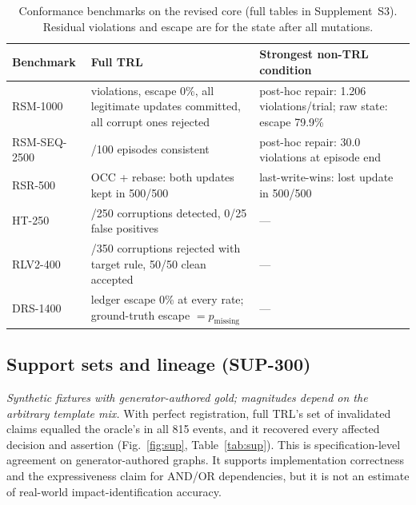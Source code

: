 \documentclass[journal]{IEEEtran}
\newcommand{\suppl}[1]{Supplement~#1}
\begin{document}
\begin{table}[t]
\centering
\caption{Conformance benchmarks on the revised core (full tables in \suppl{S3}). Residual violations and escape are for the state after all mutations.}
\label{tab:conf}
\scriptsize
\begin{tabularx}{\columnwidth}{l>{\raggedright\arraybackslash}X>{\raggedright\arraybackslash}X}
\toprule
Benchmark & Full TRL & Strongest non-TRL condition \\
\midrule
RSM-1000 & 0 violations, escape 0\%, all legitimate updates committed, all corrupt ones rejected & post-hoc repair: 1.206 violations/trial; raw state: escape 79.9\% \\
RSM-SEQ-2500 & 100/100 episodes consistent & post-hoc repair: 30.0 violations at episode end \\
RSR-500 & OCC + rebase: both updates kept in 500/500 & last-write-wins: lost update in 500/500 \\
HT-250 & 250/250 corruptions detected, 0/25 false positives & --- \\
RLV2-400 & 350/350 corruptions rejected with target rule, 50/50 clean accepted & --- \\
DRS-1400 & ledger escape 0\% at every rate; ground-truth escape $=p_{\text{missing}}$ & --- \\
\bottomrule
\end{tabularx}
\end{table}

\subsection{Support sets and lineage (SUP-300)}
\label{sec:sup_results}
\emph{Synthetic fixtures with generator-authored gold; magnitudes depend on the arbitrary template mix.} With perfect registration, full TRL's set of invalidated claims equalled the oracle's in all 815 events, and it recovered every affected decision and assertion (Fig.~\ref{fig:sup}, Table~\ref{tab:sup}). This is specification-level agreement on generator-authored graphs. It supports implementation correctness and the expressiveness claim for AND/OR dependencies, but it is not an estimate of real-world impact-identification accuracy.
\end{document}

